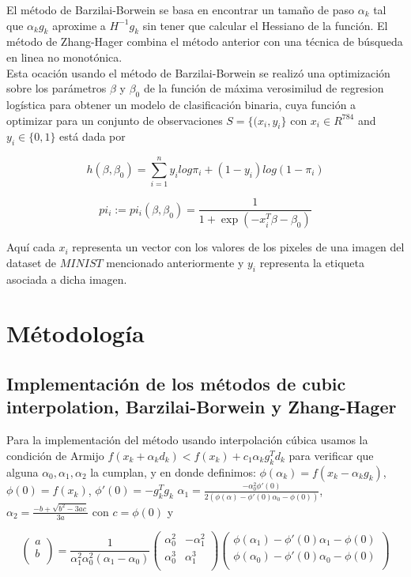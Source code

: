 \documentclass[conference]{IEEEtran}
\begin{document}
El método de Barzilai-Borwein se basa en encontrar un tamaño de paso $\alpha_k$
tal que $\alpha_k g_k$ aproxime a $H^{-1}g_k$ sin tener que calcular el Hessiano
de la función. El método de Zhang-Hager combina el método anterior con una
técnica de búsqueda en linea no monotónica.\\

Esta ocación usando el método de Barzilai-Borwein se realizó una optimización
sobre los parámetros $\beta$ y $\beta_0$ de la función de máxima verosimilud de
regresion logística para obtener un modelo de clasificación binaria, cuya
función a optimizar para un conjunto de observaciones $S = \{(x_i, y_i\}$ con
$x_i \in R ^{784}$ and $y_i \in \{0, 1\}$ está dada por

\begin{equation}
	h(\beta, \beta_0)= \sum_{i=1}^{n} y_i log\pi_i + (1-y_i)log(1-\pi_i)
\end{equation}

\begin{equation}
	pi_i:= pi_i(\beta, \beta_0) = \frac{1}{1 + \exp(-x_i^T \beta - \beta_0)}
\end{equation}

Aquí cada $x_i$ representa un vector con los valores de los pixeles de una
imagen del dataset de $MINIST$ mencionado anteriormente y $y_i$ representa la
etiqueta asociada a dicha imagen.

\section{Métodología}

\subsection{Implementación de los métodos de cubic interpolation, Barzilai-Borwein
y Zhang-Hager}


Para la implementación del método usando interpolación cúbica usamos la condición de Armijo
$f(x_k + \alpha_k d_k) < f(x_k) + c_1 \alpha_k g_k^T d_k$ para verificar que alguna
$\alpha_0, \alpha_1, \alpha_2$ la cumplan, y en donde definimos:
$\phi(\alpha_k) = f(x_k - \alpha_k g_k)$,
$\phi(0) = f(x_k)$,
$\phi'(0) = - g_k^Tg_k$
$\alpha_1 = \frac{- \alpha_0^2 \phi'(0)}{2 (\phi(\alpha) - \phi'(0) \alpha_0 - \phi(0))}$,
$\alpha_2 = \frac{-b + \sqrt{b^2 - 3ac}}{3a}$ con $c = \phi(0)$ y

$$
\begin{pmatrix}
	a\\
	b\\
\end{pmatrix} =
\frac{1}{\alpha_1^2\alpha_0^2(\alpha_1 - \alpha_0)}
\begin{pmatrix}
	\alpha_0^2 & -\alpha_1^2\\
	\alpha_0^3 & \alpha_1^3\\
\end{pmatrix}
\begin{pmatrix}
	\phi(\alpha_1) - \phi'(0)\alpha_1 - \phi(0)\\
	\phi(\alpha_0) - \phi'(0)\alpha_0 - \phi(0)\\
\end{pmatrix}
$$ \\
\end{document}
